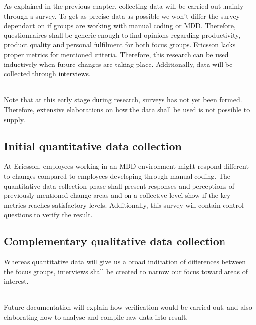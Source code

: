 \documentclass[ProjectPlan_innit.tex]{subfiles}
\begin{document}
As explained in the previous chapter, collecting data will be carried out mainly through a survey. To get as precise data as possible we won't differ the survey dependant on if groups are working with manual coding or MDD. Therefore, questionnaires shall be generic enough to find opinions regarding productivity, product quality and personal fulfilment for both focus groups. Ericsson lacks proper metrics for mentioned criteria. Therefore, this research can be used inductively when future changes are taking place. Additionally, data will be collected through interviews.

\hspace{0pt}\\ Note that at this early stage during research, surveys has not yet been formed. Therefore, extensive elaborations on how the data shall be used is not possible to supply. 

\subsection{Initial quantitative data collection}
At Ericsson, employees working in an MDD environment might respond different to changes compared to employees developing through manual coding. The quantitative data collection phase shall present responses and perceptions of previously mentioned change areas and on a collective level show if the key metrics reaches satisfactory levels. Additionally, this survey will contain control questions to verify the result.

\subsection{Complementary qualitative data collection}


Whereas quantitative data will give us a broad indication of differences between the focus groups, interviews shall be created to narrow our focus toward areas of interest. 

\hspace{0pt}\\ Future documentation will explain how verification would be carried out, and also elaborating how to analyse and compile raw data into result.
\end{document}
